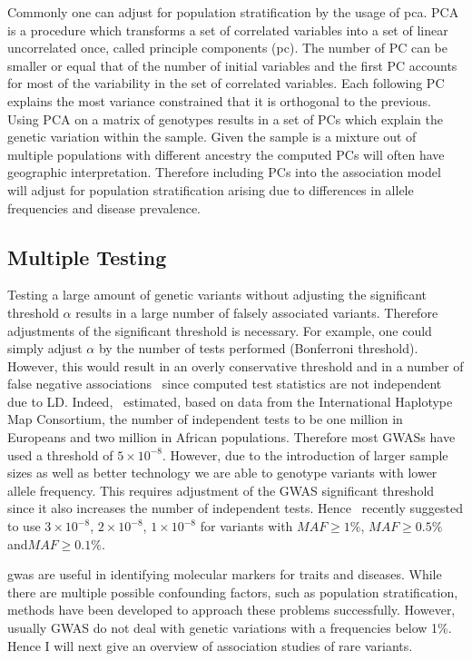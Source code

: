 \documentclass[../header.tex]{subfiles}
\begin{document}
Commonly one can adjust for population stratification by the usage of \acrfull{pca}.
PCA is a procedure which transforms a set of correlated variables into a set of linear uncorrelated once, called principle components (\acrshort{pc}).
The number of PC can be smaller or equal that of the number of initial variables and the first PC accounts for most of the variability in the set of correlated variables.
Each following PC explains the most variance constrained that it is orthogonal to the previous.
Using PCA on a matrix of genotypes results in a set of PCs which explain the genetic variation within the sample.
Given the sample is a mixture out of multiple populations with different ancestry the computed PCs will often have geographic interpretation.
Therefore including PCs into the association model will adjust for population stratification arising due to differences in allele frequencies and disease prevalence.

\subsection{Multiple Testing}
\label{ssec:multiple_testing}

Testing a large amount of genetic variants without adjusting the significant threshold $\alpha$ results in a large number of falsely associated variants.
Therefore adjustments of the significant threshold is necessary.
For example, one could simply adjust $\alpha$ by the number of tests performed (Bonferroni threshold).
However, this would result in an overly conservative threshold and in a number of false negative associations~\cite{Benjamini1995} since computed test statistics are not independent due to LD\@.
Indeed,~\citet{Peer2008} estimated, based on data from the International Haplotype Map Consortium, the number of independent tests to be one million in Europeans and two million in African populations.
Therefore most GWASs have used a threshold of $5\times 10^{-8}$.
However, due to the introduction of larger sample sizes as well as better technology we are able to genotype variants with lower allele frequency.
This requires adjustment of the GWAS significant threshold since it also increases the number of independent tests.
Hence~\citet{Fadista2016} recently suggested to use $3\times10^{-8}$, $2\times10^{-8}$, $1\times10^{-8}$ for variants with $MAF\ge1\%$, $MAF\ge0.5\%$ and$ MAF\ge0.1\%$.

\acrshort{gwas} are useful in identifying molecular markers for traits and diseases.
While there are multiple possible confounding factors, such as population stratification, methods have been developed to approach these problems successfully.
However, usually GWAS do not deal with genetic variations with a frequencies below 1\%.
Hence I will next give an overview of association studies of rare variants.
\end{document}
